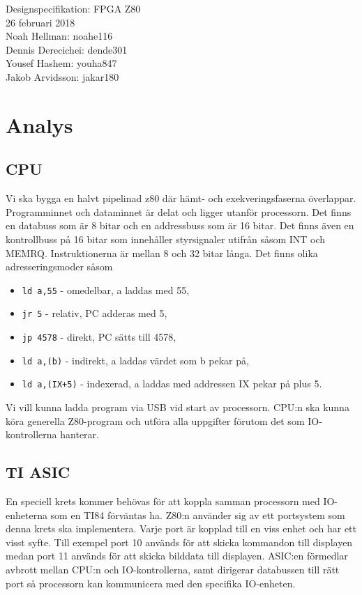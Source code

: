 \documentclass[12pt]{article}
\begin{document}
\begin{center}
\vspace*{15mm}
{\Huge Designspecifikation: FPGA Z80}\\
\vspace{15mm}
{\large 26 februari 2018}\\
\vspace{15mm}
Noah Hellman: noahe116 \\
Dennis Derecichei: dende301 \\
Yousef Hashem: youha847 \\
Jakob Arvidsson: jakar180 \\
\end{center}

\vspace{2cm}
\tableofcontents
\newpage

\section{Analys}
\subsection{CPU}
Vi ska bygga en halvt pipelinad z80 där hämt- och exekveringsfaserna
överlappar. Programminnet och dataminnet är delat och ligger utanför
processorn. Det finns en databuss som är 8 bitar och en addressbuss som är 16
bitar. Det finns även en kontrollbuss på 16 bitar som innehåller styrsignaler
utifrån såsom INT och MEMRQ. Instruktionerna är mellan 8 och 32 bitar långa.
Det finns olika adresseringsmoder såsom
\begin{itemize}
    \item \texttt{ld a,55} - omedelbar, a laddas med 55,
    \item \texttt{jr 5} - relativ, PC adderas med 5,
    \item \texttt{jp 4578} - direkt, PC sätts till 4578,
    \item \texttt{ld a,(b)} - indirekt, a laddas värdet som b pekar på,
    \item \texttt{ld a,(IX+5)} - indexerad, a laddas med addressen IX pekar på
        plus 5.
\end{itemize}
Vi vill kunna ladda program via USB vid start av processorn. CPU:n ska kunna
köra generella Z80-program och utföra alla uppgifter förutom det som
IO-kontrollerna hanterar.

\subsection{TI ASIC}
En speciell krets kommer behövas för att koppla samman processorn med
IO-enheterna som en TI84 förväntas ha. Z80:n använder sig av ett portsystem som
denna krets ska implementera. Varje port är kopplad till en viss enhet och har
ett visst syfte. Till exempel port 10 används för att skicka kommandon till
displayen medan port 11 används för att skicka bilddata till displayen. ASIC:en
förmedlar avbrott mellan CPU:n och IO-kontrollerna, samt dirigerar databussen
till rätt port så processorn kan kommunicera med den specifika IO-enheten.
\end{document}
